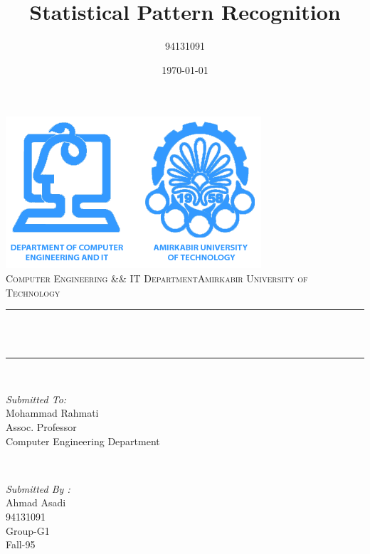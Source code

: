 \documentclass[12pt]{article}
\title{Statistical Pattern Recognition}								%
\author{94131091}								%
\date{\today}											%
\makeatletter
\let\thetitle\@title
\makeatother
\begin{document}

\begin{titlepage}
	\centering
    \vspace*{0.5 cm}
    \includegraphics[scale = 0.8]{Imgs/logo.png}\\[1.0 cm]	%
    \textsc{\Large Computer Engineering \&\& IT Department\newline\newline Amirkabir University of Technology}\\[2.0 cm]	%
	\rule{\linewidth}{0.2 mm} \\[0.4 cm]
	{ \huge \bfseries \thetitle}\\
	\rule{\linewidth}{0.2 mm} \\[1.5 cm]
	
	\begin{minipage}{0.4\textwidth}
		\begin{flushleft} \large
			\emph{Submitted To:}\\
			Mohammad Rahmati\\
            Assoc. Professor\\
            Computer Engineering Department\\
			\end{flushleft}
			\end{minipage}~
			\begin{minipage}{0.4\textwidth}
            
			\begin{flushright} \large
			\emph{Submitted By :} \\
			Ahmad Asadi\\
            94131091\\
            Group-G1\\
            Fall-95\\
		\end{flushright}
        
	\end{minipage}\\[2 cm]
	
	
    
    
    
    
	
\end{titlepage}
\end{document}
